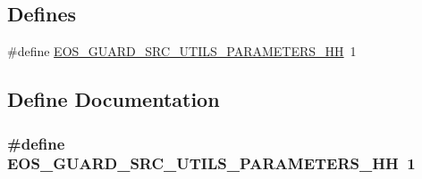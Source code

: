 \subsection*{Defines}
\begin{DoxyCompactItemize}
\item 
\#define \hyperlink{parameters_8hh_a59b39df17f16760b49fb66b7dd5bee9c}{EOS\_\-GUARD\_\-SRC\_\-UTILS\_\-PARAMETERS\_\-HH}~1
\end{DoxyCompactItemize}


\subsection{Define Documentation}
\hypertarget{parameters_8hh_a59b39df17f16760b49fb66b7dd5bee9c}{
\subsubsection[{EOS\_\-GUARD\_\-SRC\_\-UTILS\_\-PARAMETERS\_\-HH}]{\setlength{\rightskip}{0pt plus 5cm}\#define EOS\_\-GUARD\_\-SRC\_\-UTILS\_\-PARAMETERS\_\-HH~1}}
\label{parameters_8hh_a59b39df17f16760b49fb66b7dd5bee9c}
